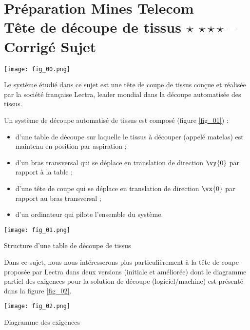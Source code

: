 \chapter*{Préparation Mines Telecom \\%
Tête de découpe de tissus \ifnormal $\star$ \else \fi \iftdifficile $\star\star\star$ \else \fi  -- 
\ifprof Corrigé \else Sujet \fi}

\iflivret {} \else
\ifprof  {} \else \fi
\fi

\setcounter{question}{0}
\marginnote{
\UPSTIcompetence[2]{}
}


\begin{marginfigure}
\texttt{[image: fig\_00.png]}
\end{marginfigure}


Le système étudié dans ce sujet est une tête de coupe de tissus conçue et réalisée par la société française Lectra, leader mondial dans la découpe automatisée des tissus.


Un système de découpe automatisé de tissus est composé (figure \ref{fig_01}) :
\begin{itemize}
\item d’une table de découpe sur laquelle le tissus à découper (appelé matelas) est maintenu en position par aspiration ;
\item d’un bras transversal qui se déplace en translation de direction $\vy{0}$ par rapport à la table ;
\item d’une tête de coupe qui se déplace en translation de direction $\vx{0}$ par rapport au bras transversal ;
\item d’un ordinateur qui pilote l’ensemble du système.	 
\end{itemize}

\begin{marginfigure}
\texttt{[image: fig\_01.png]}
\caption{Structure d’une table de découpe de tissus \label{fig_01}}
\end{marginfigure}
	
Dans ce sujet, nous nous intéresserons plus particulièrement à la tête de coupe proposée par Lectra dans deux versions (initiale et améliorée) dont le diagramme partiel des exigences pour la solution de découpe (logiciel/machine) est présenté dans la figure \ref{fig_02}.


\begin{marginfigure}
\texttt{[image: fig\_02.png]}
\caption{Diagramme des exigences \label{fig_02}}
\end{marginfigure}